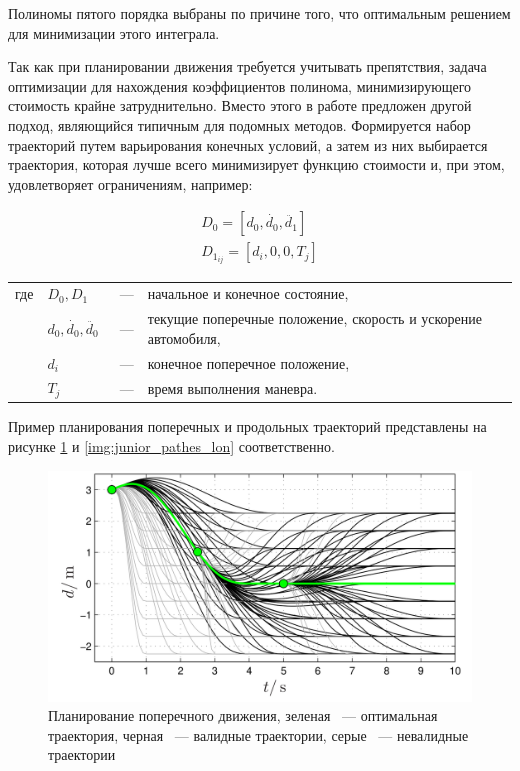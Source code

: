 Полиномы пятого порядка выбраны по причине того, что оптимальным решением для минимизации этого
интеграла.

Так как при планировании движения требуется учитывать препятствия, задача оптимизации для
нахождения коэффициентов полинома, минимизирующего стоимость крайне затруднительно. Вместо этого
в работе предложен другой подход, являющийся типичным для подомных методов. Формируется набор
траекторий путем варьирования конечных условий, а затем из них выбирается траектория, которая
лучше всего минимизирует функцию стоимости и, при этом, удовлетворяет ограничениям, например:

\begin{eqnarray}
    D_0 = [d_0, \dot{d_0}, \ddot{d_1}] \\
    D_{1_{ij}} = [d_i, 0, 0, T_j]
\end{eqnarray}

\noindent\begin{tabularx}{\linewidth}{lllX}
    где & $D_0, D_1$                    &~---& начальное и конечное состояние, \\
        & $d_0, \dot{d_0}, \ddot{d_0}$  &~---& текущие поперечные положение, скорость и ускорение автомобиля,\\
        & $d_i$                         &~---& конечное поперечное положение,\\
        & $T_j$                         &~---& время выполнения маневра.
\end{tabularx}

Пример планирования поперечных и продольных траекторий представлены на рисунке \ref{img:junior_pathes_lat} и
\ref{img:junior_pathes_lon} соответственно.

\begin{figure}[h]
    \centering
    \includegraphics[width=0.7\linewidth]{images/junior_pathes_lat}
    \caption{Планирование поперечного движения, зеленая ~--- оптимальная траектория, черная ~--- валидные траектории,
        серые ~--- невалидные траектории}
    \label{img:junior_pathes_lat}
\end{figure}


